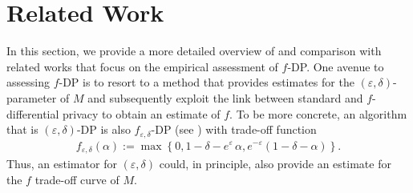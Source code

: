\section{Related Work}
\label{sec:relatedwork}





In this section, we provide a more detailed overview of and comparison with related works that focus on the empirical assessment of $f$-DP. One avenue to assessing $f$-DP is to resort to a method that provides estimates for the $(\varepsilon,\delta)$-parameter of $M$ and subsequently exploit the link between standard and $f$-differential privacy to obtain an estimate of $f$. To be more concrete, an algorithm that is $(\varepsilon,\delta)$-DP is also $f_{\varepsilon, \delta}$-DP (see \cite{Dong2022}) with trade-off function 
\begin{align} \label{f_epsilon_delta}
    f_{\varepsilon, \delta}(\alpha) := \max \left\{ 0, 1 - \delta - e^{\varepsilon} \, \alpha, e^{- \varepsilon} (1 -\delta - \alpha) \right\}.
\end{align} 
Thus, an estimator for $(\varepsilon, \delta)$ could, in principle, also provide an estimate for the $f$ trade-off curve of $M$. 

